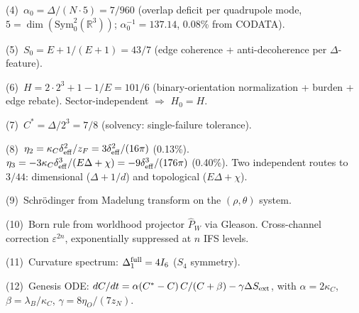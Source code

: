 \documentclass[11pt,twocolumn]{article}
\begin{document}
(4)~$\alpha_0 = \Delta/(N \cdot 5) = 7/960$ (overlap deficit per quadrupole mode, $5 = \dim(\mathrm{Sym}^2_0(\mathbb{R}^3))$; $\alpha_0^{-1} = 137.14$, 0.08\% from CODATA).

(5)~$S_0 = E + 1/(E+1) = 43/7$ (edge coherence + anti-decoherence per $\Delta$-feature).

(6)~$H = 2 \cdot 2^3 + 1 - 1/E = 101/6$ (binary-orientation normalization + burden + edge rebate).  Sector-independent $\Rightarrow$ $H_0 = H$.

(7)~$C^* = \Delta/2^3 = 7/8$ (solvency: single-failure tolerance).

(8)~$\eta_2 = \kappa_C \delta_{\rm eff}^2/z_F = 3\delta_{\rm eff}^2/(16\pi)$ (0.13\%).  $\eta_3 = -3\kappa_C\delta_{\rm eff}^3/(E\Delta + \chi) = -9\delta_{\rm eff}^3/(176\pi)$ (0.40\%).  Two independent routes to $3/44$: dimensional ($\Delta + 1/d$) and topological ($E\Delta + \chi$).

(9)~Schr\"odinger from Madelung transform\cite{madelung} on the $(\rho,\theta)$ system.

(10)~Born rule from worldhood projector $\hat{P}_W$ via Gleason.\cite{gleason}  Cross-channel correction $\varepsilon^{2n}$, exponentially suppressed at $n$ IFS levels.

(11)~Curvature spectrum: $\Delta_1^{\rm full} = 4I_6$ ($S_4$ symmetry).

(12)~Genesis ODE: $dC/dt = \alpha(C^* - C)\,C/(C+\beta) - \gamma\Delta S_{\rm ext}$, with $\alpha = 2\kappa_C$, $\beta = \lambda_B/\kappa_C$, $\gamma = 8\eta_O/(7z_N)$.


\end{document}
